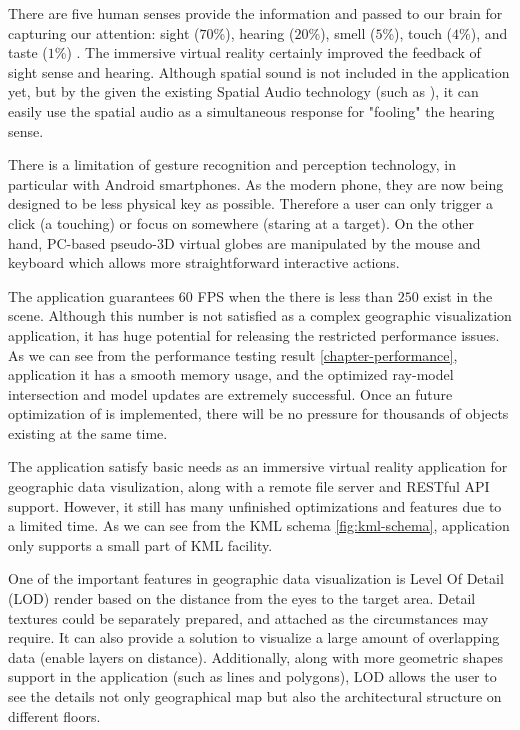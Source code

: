 There are five human senses provide the information and passed to our brain for capturing our attention: sight ($70$\%), hearing ($20$\%), smell ($5$\%), touch ($4$\%), and taste ($1$\%) \cite{mazuryk.vr.1996}. The immersive virtual reality certainly improved the feedback of sight sense and hearing. Although spatial sound is not included in the application yet, but by the given the existing Spatial Audio technology (such as \cite{google.spatial-audio.2016}), it can easily use the spatial audio as a simultaneous response for "fooling" the hearing sense.

There is a limitation of gesture recognition and perception technology, in particular with Android smartphones. As the modern phone, they are now being designed to be less physical key as possible. Therefore a user can only trigger a click (a touching) or focus on somewhere (staring at a target). On the other hand, PC-based pseudo-3D virtual globes are manipulated by the mouse and keyboard which allows more straightforward interactive actions.

The application guarantees $60$ FPS when the there is less than $250$  exist in the scene. Although this number is not satisfied as a complex geographic visualization application, it has huge potential for releasing the restricted performance issues. As we can see from the performance testing result \ref{chapter-performance}, application it has a smooth memory usage, and the optimized ray-model intersection and model updates are extremely successful. Once an future optimization of  is implemented, there will be no pressure for thousands of objects existing at the same time.

The application satisfy basic needs as an immersive virtual reality application for geographic data visulization, along with a remote file server and RESTful API support. However, it still has many unfinished optimizations and features due to a limited time. As we can see from the KML schema \ref{fig:kml-schema}, application only supports a small part of KML facility.

One of the important features in geographic data visualization is Level Of Detail (LOD) render based on the distance from the eyes to the target area. Detail textures could be separately prepared, and attached as the circumstances may require. It can also provide a solution to visualize a large amount of overlapping data (enable layers on distance). Additionally, along with more geometric shapes support in the application (such as lines and polygons), LOD allows the user to see the details not only geographical map but also the architectural structure on different floors.

